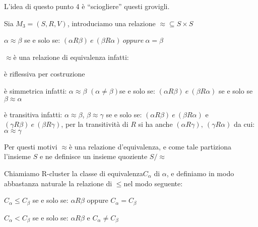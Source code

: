 L'idea di questo punto 4 è ``sciogliere'' questi grovigli.

Sia $M_{3}=(S,R,V)$, introduciamo una relazione $\approx\subseteq S\times S$

$\alpha\approx\beta$ se e solo se: $(\alpha R\beta)\ e\ (\beta R\alpha)\ oppure\ \alpha=\beta$

$\approx$è una relazione di equivalenza infatti:

è riflessiva per costruzione 

è simmetrica infatti: $\alpha\approx\beta$ $(\alpha\neq\beta)$se
e solo se: $(\alpha R\beta)\ e\ (\beta R\alpha)$ se e solo se $\beta\approx\alpha$

è transitiva infatti: $\alpha\approx\beta$, \foreignlanguage{english}{$\beta\approx\gamma$
}se e solo se: $(\alpha R\beta)\ e\ (\beta R\alpha)$ e $(\gamma R\beta)\ e\ (\beta R\gamma)$,
per la transitività di $R$ si ha anche $(\alpha R\gamma),\ (\gamma R\alpha)$
da cui: $\alpha\approx\gamma$

Per questi motivi $\approx$è una relazione d'equivalenza, e come
tale partiziona l'insieme $S$ e ne definisce un insieme quoziente
$S/\approx$

Chiamiamo R-cluster la classe di equivalenza$C_{\alpha}$ di $\alpha$,
e definiamo in modo abbastanza naturale la relazione di $\leq$nel
modo seguente:

$C_{\alpha}\leq C_{\beta}$ se e solo se: $\alpha R\beta$ oppure
$C_{\alpha}=C_{\beta}$

$C_{\alpha}<C_{\beta}$ se e solo se: $\alpha R\beta$ e $C_{\alpha}\neq C_{\beta}$ 

